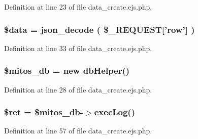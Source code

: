 \-Definition at line 23 of file data\-\_\-create.\-ejs.\-php.

\hypertarget{administration_2lists_2data__create_8ejs_8php_a6efc15b5a2314dd4b5aaa556a375c6d6}{
\subsubsection[{\$data}]{\setlength{\rightskip}{0pt plus 5cm}\$data = json\-\_\-decode ( \$\-\_\-\-R\-E\-Q\-U\-E\-S\-T\mbox{[}'row'\mbox{]} )}}\label{administration_2lists_2data__create_8ejs_8php_a6efc15b5a2314dd4b5aaa556a375c6d6}


\-Definition at line 33 of file data\-\_\-create.\-ejs.\-php.

\hypertarget{administration_2lists_2data__create_8ejs_8php_ab5d961f93efe4e2e8d8374f01dd6c65a}{
\subsubsection[{\$mitos\-\_\-db}]{\setlength{\rightskip}{0pt plus 5cm}\$mitos\-\_\-db = new {\bf db\-Helper}()}}\label{administration_2lists_2data__create_8ejs_8php_ab5d961f93efe4e2e8d8374f01dd6c65a}


\-Definition at line 28 of file data\-\_\-create.\-ejs.\-php.

\hypertarget{administration_2lists_2data__create_8ejs_8php_affd9e3eb0aad0a7ca42912cd925f148c}{
\subsubsection[{\$ret}]{\setlength{\rightskip}{0pt plus 5cm}\$ret = \$mitos\-\_\-db-\/$>$exec\-Log()}}\label{administration_2lists_2data__create_8ejs_8php_affd9e3eb0aad0a7ca42912cd925f148c}


\-Definition at line 57 of file data\-\_\-create.\-ejs.\-php.

